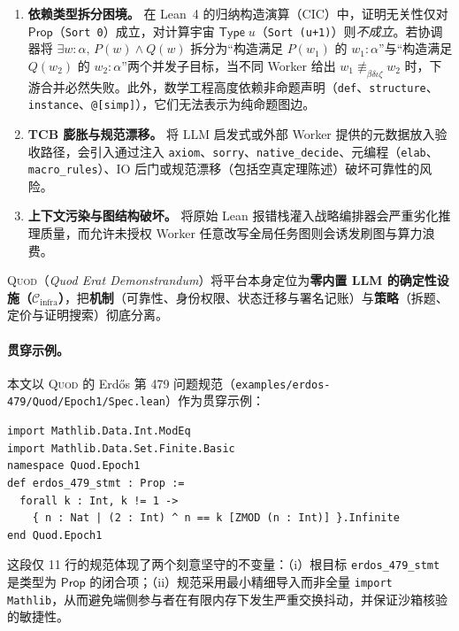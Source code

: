 \documentclass[10pt,a4paper,fontset=fandol]{ctexart}
\newcommand{\Cinfra}{\mathcal{C}_{\mathrm{infra}}}
\newcommand{\Prop}{\mathsf{Prop}}
\newcommand{\TypeU}{\mathsf{Type}\;u}
\newcommand{\DefEq}{\equiv_{\beta\delta\iota\zeta}}
\newcommand{\code}[1]{\texttt{#1}}
\begin{document}
\begin{enumerate}
  \item \textbf{依赖类型拆分困境。} 在 Lean~4 的归纳构造演算（CIC）中，证明无关性仅对 $\Prop$（\code{Sort 0}）成立，对计算宇宙 $\TypeU$（\code{Sort (u+1)}）则\emph{不成立}。若协调器将 $\exists w : \alpha,\, P(w) \land Q(w)$ 拆分为“构造满足 $P(w_1)$ 的 $w_1 : \alpha$”与“构造满足 $Q(w_2)$ 的 $w_2 : \alpha$”两个并发子目标，当不同 Worker 给出 $w_1 \not\DefEq w_2$ 时，下游合并必然失败。此外，数学工程高度依赖非命题声明（\code{def}、\code{structure}、\code{instance}、\code{@[simp]}），它们无法表示为纯命题图边。
  \item \textbf{TCB 膨胀与规范漂移。} 将 LLM 启发式或外部 Worker 提供的元数据放入验收路径，会引入通过注入 \code{axiom}、\code{sorry}、\code{native\_decide}、元编程（\code{elab}、\code{macro\_rules}）、IO 后门或规范漂移（包括空真定理陈述）破坏可靠性的风险。
  \item \textbf{上下文污染与图结构破坏。} 将原始 Lean 报错栈灌入战略编排器会严重劣化推理质量，而允许未授权 Worker 任意改写全局任务图则会诱发刷图与算力浪费。
\end{enumerate}

\textsc{Quod}（\emph{Quod Erat Demonstrandum}）将平台本身定位为\textbf{零内置 LLM 的确定性设施（$\Cinfra$）}，把\textbf{机制}（可靠性、身份权限、状态迁移与署名记账）与\textbf{策略}（拆题、定价与证明搜索）彻底分离。

\paragraph{贯穿示例。}
本文以 \textsc{Quod} 的 Erd\H{o}s 第 479 问题规范（\code{examples/erdos-479/Quod/Epoch1/Spec.lean}）作为贯穿示例：
\begin{lstlisting}[language=LeanFour]
import Mathlib.Data.Int.ModEq
import Mathlib.Data.Set.Finite.Basic
namespace Quod.Epoch1
def erdos_479_stmt : Prop :=
  forall k : Int, k != 1 ->
    { n : Nat | (2 : Int) ^ n == k [ZMOD (n : Int)] }.Infinite
end Quod.Epoch1
\end{lstlisting}
这段仅 11 行的规范体现了两个刻意坚守的不变量：（i）根目标 \code{erdos\_479\_stmt} 是类型为 $\Prop$ 的闭合项；（ii）规范采用最小精细导入而非全量 \code{import Mathlib}，从而避免端侧参与者在有限内存下发生严重交换抖动，并保证沙箱核验的敏捷性。
\end{document}
